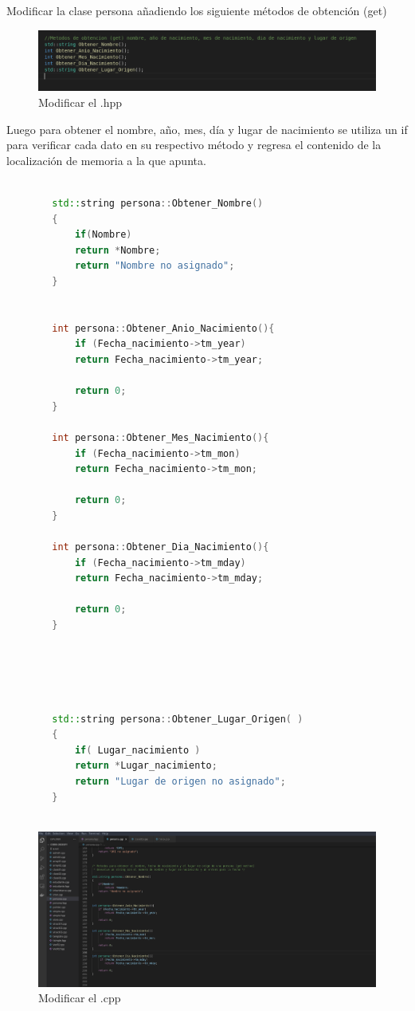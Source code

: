 \documentclass[11pt]{article}
\begin{document}
	

	\begin{problem}
Modificar la clase persona añadiendo los siguiente métodos
de obtención (get)
	\end{problem}

	\begin{figure}[H]
	\centering
	\includegraphics[width=0.7\linewidth]{img2}
	\caption{Modificar el .hpp}
	\label{fig:img2}
\end{figure}



Luego para obtener	el nombre, año, mes, día y lugar de nacimiento se utiliza un if para verificar cada dato en su respectivo método y regresa el contenido de la localización de memoria a la que apunta. 

 
	\begin{lstlisting}[language=c++]

		std::string persona::Obtener_Nombre()
		{
			if(Nombre)
			return *Nombre;
			return "Nombre no asignado";
		}
		
		
		int persona::Obtener_Anio_Nacimiento(){
			if (Fecha_nacimiento->tm_year)
			return Fecha_nacimiento->tm_year;
			
			return 0;
		}
		
		int persona::Obtener_Mes_Nacimiento(){
			if (Fecha_nacimiento->tm_mon)
			return Fecha_nacimiento->tm_mon;
			
			return 0;
		}
		
		int persona::Obtener_Dia_Nacimiento(){
			if (Fecha_nacimiento->tm_mday)
			return Fecha_nacimiento->tm_mday;
			
			return 0;
		}
		
		
		
		
		
		std::string persona::Obtener_Lugar_Origen( )
		{
			if( Lugar_nacimiento )
			return *Lugar_nacimiento;
			return "Lugar de origen no asignado";
		}
		
	\end{lstlisting}
	
		\begin{figure}[H]
		\centering
		\includegraphics[width=0.7\linewidth]{img3}
		\caption{Modificar el .cpp}
		\label{fig:img3}
	\end{figure}
	
\end{document}
